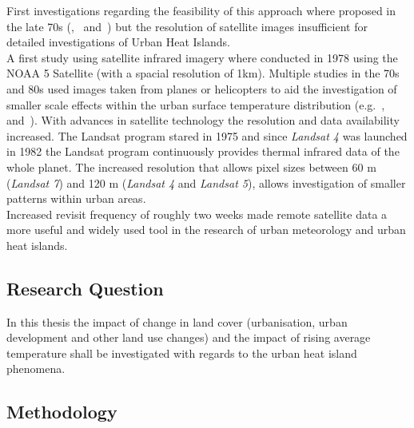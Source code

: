 \documentclass[a4paper, english]{article}
\begin{document}
  First investigations regarding the feasibility of this approach where proposed in the late 70s (\cite{Watson1975},~\cite{Carlson1977} and~\cite{Block1978}) but the resolution of satellite images insufficient for detailed investigations of Urban Heat Islands.\\
  A first study using satellite infrared imagery where conducted in 1978 using the NOAA 5 Satellite (with a spacial resolution of 1km)\cite{Matson1978}. 
  Multiple studies in the 70s and 80s used images taken from planes or helicopters to aid the investigation of smaller scale effects within the urban surface temperature distribution (e.g.~\cite{Landsberg1979},~\cite{ljungberg1980use} and~\cite{Foster1981}).
  With advances in satellite technology the resolution and data availability increased. 
  The Landsat program stared in 1975 and since \textit{Landsat 4} was launched in 1982 the Landsat program continuously provides thermal infrared data of the whole planet. 
  The increased resolution that allows pixel sizes between 60 m (\textit{Landsat 7}) and 120 m (\textit{Landsat 4} and \textit{Landsat 5}), allows investigation of smaller patterns within urban areas.\\
  Increased revisit frequency of roughly two weeks made remote satellite data a more useful and widely used tool in the research of urban meteorology and urban heat islands. 
  
  \subsection{Research Question}
    In this thesis the impact of change in land cover (urbanisation, urban development and other land use changes) and the impact of rising average temperature shall be investigated with regards to the urban heat island phenomena.

    \subsection{Methodology}
    



\end{document}
